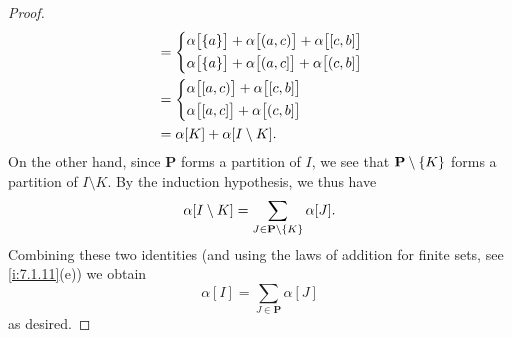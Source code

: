 \begin{proof}
\begin{align*}
                           & = \begin{dcases}
                                 \alpha\big[\set{a}\big] + \alpha\big[(a, c)\big] + \alpha\big[[c, b]\big] \\
                                 \alpha\big[\set{a}\big] + \alpha\big[(a, c]\big] + \alpha\big[(c, b]\big]
                               \end{dcases} \\
                           & = \begin{dcases}
                                 \alpha\big[[a, c)\big] + \alpha\big[[c, b]\big] \\
                                   \alpha\big[[a, c]\big] + \alpha\big[(c, b]\big]
                               \end{dcases}                                         \\
                           & = \alpha[K] + \alpha[I \setminus K].
  \end{align*}
  On the other hand, since \(\mathbf{P}\) forms a partition of \(I\), we see that \(\mathbf{P} \setminus \left\lbrace K\right\rbrace\) forms a partition of \(I \setminus K\).
  By the induction hypothesis, we thus have
  \[
    \alpha[I \setminus K] = \sum_{J \in \mathbf{P} \setminus \left\lbrace K\right\rbrace} \alpha[J].
  \]
  Combining these two identities (and using the laws of addition for finite sets, see \cref{i:7.1.11}(e)) we obtain
  \[
    \alpha[I] = \sum_{J \in \mathbf{P}} \alpha[J]
  \]
  as desired.


\end{proof}
